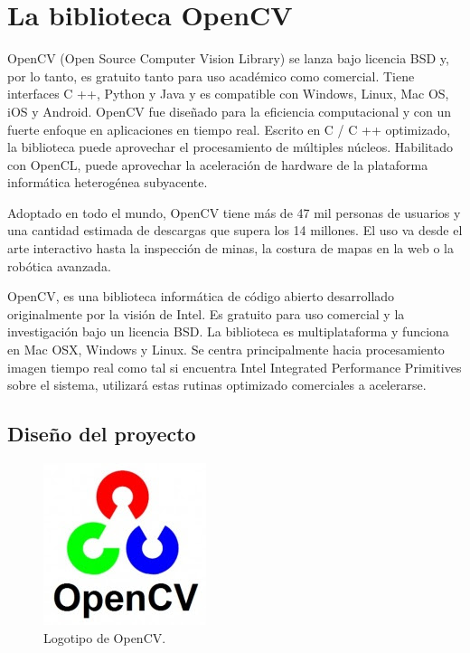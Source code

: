 \chapter{La biblioteca OpenCV}

OpenCV (Open Source Computer Vision Library) se lanza bajo licencia BSD y, por lo tanto, es gratuito tanto para uso académico como comercial. Tiene interfaces C ++, Python y Java y es compatible con Windows, Linux, Mac OS, iOS y Android. OpenCV fue diseñado para la eficiencia computacional y con un fuerte enfoque en aplicaciones en tiempo real. Escrito en C / C ++ optimizado, la biblioteca puede aprovechar el procesamiento de múltiples núcleos. Habilitado con OpenCL, puede aprovechar la aceleración de hardware de la plataforma informática heterogénea subyacente.

Adoptado en todo el mundo, OpenCV tiene más de 47 mil personas de usuarios y una cantidad estimada de descargas que supera los 14 millones. El uso va desde el arte interactivo hasta la inspección de minas, la costura de mapas en la web o la robótica avanzada. \cite{OpenCVWebSite}

OpenCV, es una biblioteca informática de código abierto desarrollado originalmente por la visión de Intel. Es gratuito para uso comercial y la investigación bajo un licencia BSD. La biblioteca es multiplataforma y funciona en Mac OSX, Windows y Linux. Se centra principalmente hacia procesamiento imagen tiempo real como tal si encuentra Intel Integrated Performance Primitives sobre el sistema, utilizará estas rutinas optimizado comerciales a acelerarse.

\section{Diseño del proyecto}

\begin{figure}[h!]
  	\centering
	\includegraphics[scale=1]{FotosPaginasWebHeliostatos/unnamed(9).jpg}
	\caption{Logotipo de OpenCV.
	\label{fig:FotosPaginasWebHeliostatos/unnamed(9).jpg}}
\end{figure}

